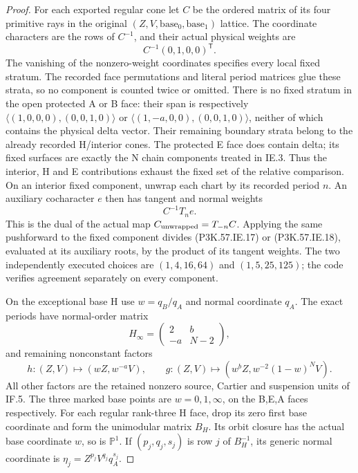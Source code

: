 \begin{proof}
For each exported regular cone let \(C\) be the
ordered matrix of its four primitive rays in the
original \((Z,V,\text{base}_0,\text{base}_1)\)
lattice. The coordinate characters are the rows of
\(C^{-1}\), and their actual physical weights are
\[
                    C^{-1}(0,1,0,0)^{\mathsf T}.        \tag{P3K.57.IE.19}
\]
The vanishing of the nonzero-weight coordinates
specifies every local fixed stratum. The recorded
face permutations and literal period matrices glue
these strata, so no component is counted twice or
omitted. There is no fixed stratum in the open
protected A or B face: their span is respectively
\(\langle(1,0,0,0),(0,0,1,0)\rangle\) or
\(\langle(1,-a,0,0),(0,0,1,0)\rangle\), neither
of which contains the physical delta vector.
Their remaining boundary strata belong to the
already recorded H/interior cones. The protected
E face does contain delta; its fixed surfaces are
exactly the N chain components treated in IE.3.
Thus the interior, H and E contributions exhaust
the fixed set of the relative comparison.
On an interior fixed component, unwrap
each chart by its recorded period \(n\). An
auxiliary cocharacter \(e\) then has tangent and
normal weights
\[
                            C^{-1}T_n e.                 \tag{P3K.57.IE.20}
\]
This is the dual of the actual map
\(C_{\rm unwrapped}=T_{-n}C\). Applying the same
pushforward to the fixed component divides (P3K.57.IE.17)
or (P3K.57.IE.18), evaluated at its auxiliary roots, by
the product of its tangent weights. The two
independently executed choices are
\((1,4,16,64)\) and \((1,5,25,125)\); the code
verifies agreement separately on every component.

On the exceptional base H use \(w=q_B/q_A\) and
normal coordinate \(q_A\). The exact periods have
normal-order matrix
\[
 H_\infty=\begin{pmatrix}2&b\\-a&N-2\end{pmatrix},
\]
and remaining nonconstant factors
\[
 h:(Z,V)\mapsto(wZ,w^{-a}V),\qquad
 g:(Z,V)\mapsto(w^bZ,w^{-2}(1-w)^N V).                 \tag{P3K.57.IE.21}
\]
All other factors are the retained nonzero source,
Cartier and suspension units of IF.5. The three
marked base points are \(w=0,1,\infty\), on the
B,E,A faces respectively. For each regular rank-three
H face, drop its zero first base coordinate and
form the unimodular matrix \(B_H\). Its orbit
closure has the actual base coordinate \(w\), so
is \(\mathbb P^1\). If
\((p_j,q_j,s_j)\) is row \(j\) of \(B_H^{-1}\),
its generic normal coordinate is
\(\eta_j=Z^{p_j}V^{q_j}q_A^{s_j}\).


\end{proof}
